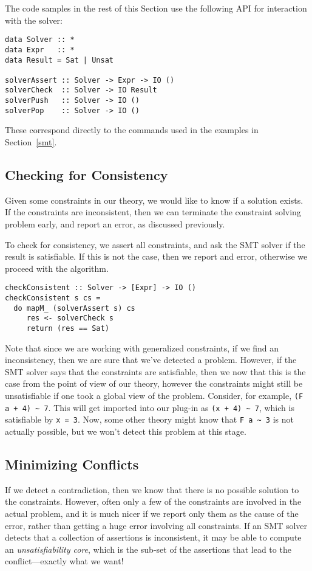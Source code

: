 \documentclass{sigplanconf}
\begin{document}
The code samples in the rest of this Section use the following
API for interaction with the solver:
\begin{Verbatim}
data Solver :: *
data Expr   :: *
data Result = Sat | Unsat

solverAssert :: Solver -> Expr -> IO ()
solverCheck  :: Solver -> IO Result
solverPush   :: Solver -> IO ()
solverPop    :: Solver -> IO ()
\end{Verbatim}
These correspond directly to the commands used in the examples in
Section~\ref{smt}.



\subsection{Checking for Consistency}

Given some constraints in our theory, we would like to know if a
solution exists.  If the constraints are inconsistent, then we can
terminate the constraint solving problem early, and report an error,
as discussed previously.

To check for consistency, we assert all constraints, and ask the SMT
solver if the result is satisfiable.  If this is not the case, then
we report and error, otherwise we proceed with the algorithm.
\begin{Verbatim}
checkConsistent :: Solver -> [Expr] -> IO ()
checkConsistent s cs =
  do mapM_ (solverAssert s) cs
     res <- solverCheck s
     return (res == Sat)
\end{Verbatim}

Note that since we are working with generalized constraints, if we find an
inconsistency, then we are sure that we've detected a problem.  However,
if the SMT solver says that the constraints are satisfiable, then
we now that this is the case from the point of view of our theory,
however the constraints might still be unsatisfiable if one took a global
view of the problem.  Consider, for example, \Verb"(F a + 4) ~ 7".
This will get imported into our plug-in as \Verb"(x + 4) ~ 7", which is
satisfiable by \Verb"x = 3".  Now, some other theory might know that
\Verb"F a ~ 3" is not actually possible, but we won't detect this problem
at this stage.

\subsection{Minimizing Conflicts}
If we detect a contradiction, then
we know that there is no possible solution to the constraints.  However,
often only a few of the constraints are involved in the actual problem,
and it is much nicer if we report only them as the cause of the error,
rather than getting a huge error involving all constraints.  If an SMT
solver detects that a collection of assertions is inconsistent, it may
be able to compute an {\em unsatisfiability core}, which is the sub-set
of the assertions that lead to the conflict---exactly what we want!
\end{document}
